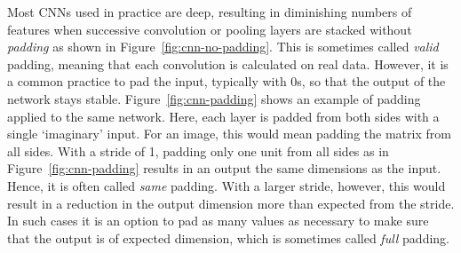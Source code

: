 Most CNNs used in practice are deep,
resulting in diminishing numbers of features
when successive convolution or pooling layers are
stacked without \emph{padding} as shown in Figure~\ref{fig:cnn-no-padding}.
This is sometimes called \emph{valid} padding,
meaning that each convolution is calculated on real data.
However, it is a common practice to pad the input,
typically with \num{0}s,
so that the output of the network stays stable.
Figure~\ref{fig:cnn-padding} shows an example of padding applied
to the same network.
Here, each layer is padded from both sides with a single `imaginary' input.
For an image, this would mean padding the matrix from all sides.
With a stride of \num{1},
padding only one unit from all sides as in Figure~\ref{fig:cnn-padding}
results in an output the same dimensions as the input.
Hence, it is often called \emph{same} padding.
With a larger stride, however, this would result in a reduction
in the output dimension more than expected from the stride.
In such cases it is an option to pad as many values as necessary
to make sure that the output is of expected dimension,
which is sometimes called \emph{full} padding.


